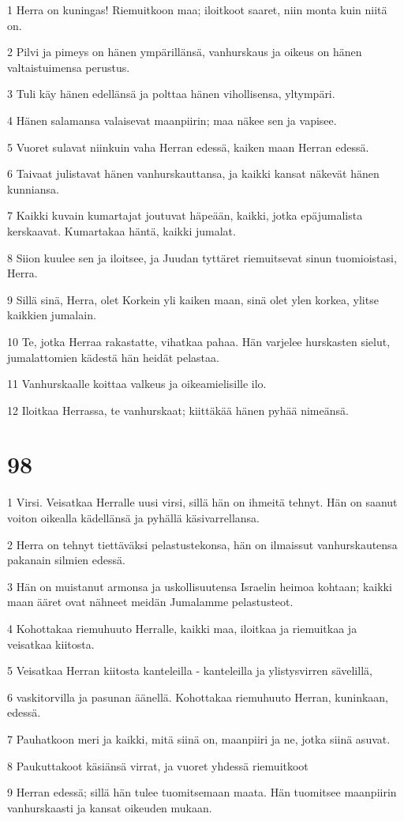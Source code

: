 \par 1 Herra on kuningas! Riemuitkoon maa; iloitkoot saaret, niin monta kuin niitä on.
\par 2 Pilvi ja pimeys on hänen ympärillänsä, vanhurskaus ja oikeus on hänen valtaistuimensa perustus.
\par 3 Tuli käy hänen edellänsä ja polttaa hänen vihollisensa, yltympäri.
\par 4 Hänen salamansa valaisevat maanpiirin; maa näkee sen ja vapisee.
\par 5 Vuoret sulavat niinkuin vaha Herran edessä, kaiken maan Herran edessä.
\par 6 Taivaat julistavat hänen vanhurskauttansa, ja kaikki kansat näkevät hänen kunniansa.
\par 7 Kaikki kuvain kumartajat joutuvat häpeään, kaikki, jotka epäjumalista kerskaavat. Kumartakaa häntä, kaikki jumalat.
\par 8 Siion kuulee sen ja iloitsee, ja Juudan tyttäret riemuitsevat sinun tuomioistasi, Herra.
\par 9 Sillä sinä, Herra, olet Korkein yli kaiken maan, sinä olet ylen korkea, ylitse kaikkien jumalain.
\par 10 Te, jotka Herraa rakastatte, vihatkaa pahaa. Hän varjelee hurskasten sielut, jumalattomien kädestä hän heidät pelastaa.
\par 11 Vanhurskaalle koittaa valkeus ja oikeamielisille ilo.
\par 12 Iloitkaa Herrassa, te vanhurskaat; kiittäkää hänen pyhää nimeänsä.

\chapter{98}

\par 1 Virsi. Veisatkaa Herralle uusi virsi, sillä hän on ihmeitä tehnyt. Hän on saanut voiton oikealla kädellänsä ja pyhällä käsivarrellansa.
\par 2 Herra on tehnyt tiettäväksi pelastustekonsa, hän on ilmaissut vanhurskautensa pakanain silmien edessä.
\par 3 Hän on muistanut armonsa ja uskollisuutensa Israelin heimoa kohtaan; kaikki maan ääret ovat nähneet meidän Jumalamme pelastusteot.
\par 4 Kohottakaa riemuhuuto Herralle, kaikki maa, iloitkaa ja riemuitkaa ja veisatkaa kiitosta.
\par 5 Veisatkaa Herran kiitosta kanteleilla - kanteleilla ja ylistysvirren sävelillä,
\par 6 vaskitorvilla ja pasunan äänellä. Kohottakaa riemuhuuto Herran, kuninkaan, edessä.
\par 7 Pauhatkoon meri ja kaikki, mitä siinä on, maanpiiri ja ne, jotka siinä asuvat.
\par 8 Paukuttakoot käsiänsä virrat, ja vuoret yhdessä riemuitkoot
\par 9 Herran edessä; sillä hän tulee tuomitsemaan maata. Hän tuomitsee maanpiirin vanhurskaasti ja kansat oikeuden mukaan.

